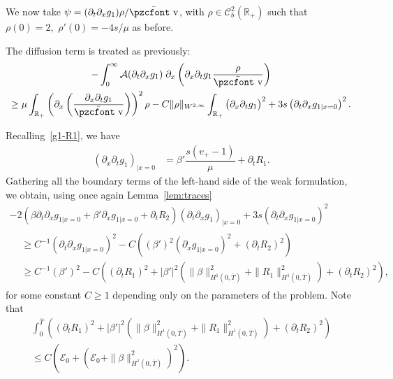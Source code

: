 \documentclass[10pt]{amsart}
\theoremstyle{definition}\newtheorem{defi}[theo]{Definition}\newtheorem{rema}[theo]{Remark}\newtheorem{exam}[theo]{Example}\newtheorem{exem}[theo]{Example}\newtheorem{nota}[theo]{Notation}
\newcommand{\mathpzc}[1]{\text{\pzcfont #1}}
\newcommand{\R}{\mathbb{R}}
\newcommand{\p}{\partial}
\newcommand{\bv}{\bar{\mathpzc{v}}}
\newcommand{\cA}{\mathcal A}
\newcommand{\cE}{\mathcal E}
\newcommand{\cC}{\mathcal C}
\begin{document}
We now take $\psi=(\partial_t \partial_x g_1) \rho/\bv$, with $\rho\in \cC^2_b(\R_+)$ such that $\rho(0)=2,$ $\rho'(0)=-4s/\mu$ as before.

The diffusion term is treated as previously:
\begin{multline*}
-\int_0^\infty \cA(\p_t\p_x g_1)\; \p_x \left(\p_x \partial_t g_1 \dfrac{\rho}{\bv}\right)\\
\geq \mu \int_{\R_+} \left(\partial_x \left(\dfrac{\partial_x \partial_t g_1}{\bv} \right) \right)^2 \rho
- C \|\rho\|_{W^{2,\infty}} \int_{\R_+} \big(\partial_x \partial_t g_1\big)^2+ 3s \left(\partial_t \p_x g_{1|x=0}\right)^2.
\end{multline*}

Recalling~\eqref{g1-R1}, we have
\begin{align}
(\partial_x \partial_t g_1)_{|x=0} & = \beta' \dfrac{s (v_+ -1)}{\mu} + \partial_t R_1.
\end{align}
Gathering all the boundary terms of the left-hand side of the weak formulation, we obtain, using once again Lemma~\ref{lem:traces}
\begin{multline*}
-2\left(\beta\p_t\p_x g_{1|x=0} + \beta' \p_xg_{1|x=0} + \p_t R_2\right)\left(\partial_t \partial_x g_1\right)_{|x=0} + 3s \left(\partial_t \p_x g_{1|x=0}\right)^2 \\
\begin{aligned}
&\geq C^{-1} \left(\partial_t \p_x g_{1|x=0}\right)^2 - C \left((\beta')^2 \left(\p_xg_{1|x=0}\right)^2 + \left(\p_t R_2\right)^2\right)\\
&\geq C^{-1} (\beta')^2 - C \left(\left(\p_t R_1\right)^2 + |\beta'|^2 \left(\|\beta\|_{H^1\left(0,\overline{T}\right)}^2 + \|R_1\|_{H^1\left(0,\overline{T}\right)}^2\right) + (\p_t R_2)^2\right),
\end{aligned}
\end{multline*}
for some constant $C\geq 1$ depending only on the parameters of the problem. Note that
\begin{multline*}
\int_0^{\overline{T}} \left(\left(\p_t R_1\right)^2 + |\beta'|^2 \left(\|\beta\|_{H^1\left(0,\overline{T}\right)}^2 + \|R_1\|_{H^1\left(0,\overline{T}\right)}^2\right) +\left(\p_t R_2\right)^2\right)\\
\leq C\left(\cE_0 + \left(\cE_0+ \|\beta\|_{H^1\left(0,\overline{T}\right)}^2\right)^2 \right).
\end{multline*}
\end{document}
